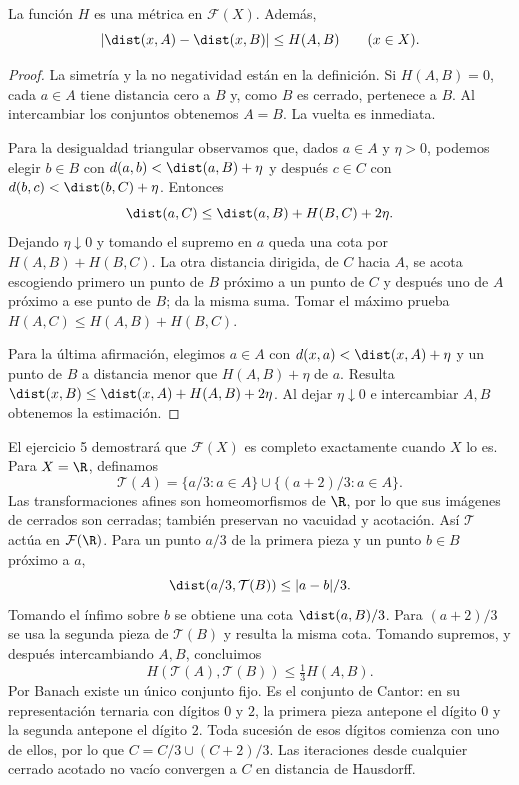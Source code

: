 \begin{proposicion}\label{ch11:hausdorff-metrica}
La función $H$ es una métrica en $\mathcal F(X)$. Además,
\[
 |\dist(x,A)-\dist(x,B)|\leq H(A,B)\qquad(x\in X).
\]
\end{proposicion}
\begin{proof}
La simetría y la no negatividad están en la definición. Si $H(A,B)=0$, cada $a\in A$ tiene distancia cero a $B$ y, como $B$ es cerrado, pertenece a $B$. Al intercambiar los conjuntos obtenemos $A=B$. La vuelta es inmediata.

Para la desigualdad triangular observamos que, dados $a\in A$ y $\eta>0$, podemos elegir $b\in B$ con $d(a,b)<\dist(a,B)+\eta$ y después $c\in C$ con $d(b,c)<\dist(b,C)+\eta$. Entonces
\[
 \dist(a,C)\leq\dist(a,B)+H(B,C)+2\eta.
\]
Dejando $\eta\downarrow0$ y tomando el supremo en $a$ queda una cota por $H(A,B)+H(B,C)$. La otra distancia dirigida, de $C$ hacia $A$, se acota escogiendo primero un punto de $B$ próximo a un punto de $C$ y después uno de $A$ próximo a ese punto de $B$; da la misma suma. Tomar el máximo prueba $H(A,C)\leq H(A,B)+H(B,C)$.

Para la última afirmación, elegimos $a\in A$ con $d(x,a)<\dist(x,A)+\eta$ y un punto de $B$ a distancia menor que $H(A,B)+\eta$ de $a$. Resulta $\dist(x,B)\leq\dist(x,A)+H(A,B)+2\eta$. Al dejar $\eta\downarrow0$ e intercambiar $A,B$ obtenemos la estimación.
\end{proof}

El ejercicio 5 demostrará que $\mathcal F(X)$ es completo exactamente cuando $X$ lo es. Para $X=\R$, definamos
\[
 \mathcal T(A)=\{a/3:a\in A\}\cup\{(a+2)/3:a\in A\}.
\]
Las transformaciones afines son homeomorfismos de $\R$, por lo que sus imágenes de cerrados son cerradas; también preservan no vacuidad y acotación. Así $\mathcal T$ actúa en $\mathcal F(\R)$. Para un punto $a/3$ de la primera pieza y un punto $b\in B$ próximo a $a$,
\[
 \dist(a/3,\mathcal T(B))\leq|a-b|/3.
\]
Tomando el ínfimo sobre $b$ se obtiene una cota $\dist(a,B)/3$. Para $(a+2)/3$ se usa la segunda pieza de $\mathcal T(B)$ y resulta la misma cota. Tomando supremos, y después intercambiando $A,B$, concluimos
\[
 H(\mathcal T(A),\mathcal T(B))\leq\tfrac13H(A,B).
\]
Por Banach existe un único conjunto fijo. Es el conjunto de Cantor: en su representación ternaria con dígitos $0$ y $2$, la primera pieza antepone el dígito $0$ y la segunda antepone el dígito $2$. Toda sucesión de esos dígitos comienza con uno de ellos, por lo que $C=C/3\cup(C+2)/3$. Las iteraciones desde cualquier cerrado acotado no vacío convergen a $C$ en distancia de Hausdorff.

